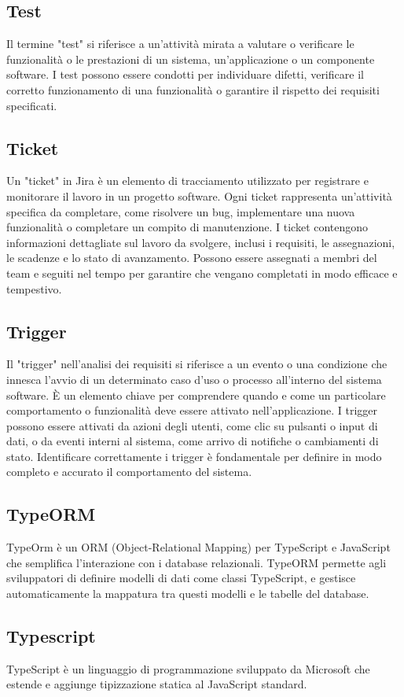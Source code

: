 \subsection*{Test} 
Il termine "test" si riferisce a un'attività mirata a valutare o verificare le funzionalità o le prestazioni di un sistema, un'applicazione o un componente software. I test possono essere condotti per individuare difetti, verificare il corretto funzionamento di una funzionalità o garantire il rispetto dei requisiti specificati. 
\subsection*{Ticket} 
Un "ticket" in Jira è un elemento di tracciamento utilizzato per registrare e monitorare il lavoro in un progetto software. Ogni ticket rappresenta un'attività specifica da completare, come risolvere un bug, implementare una nuova funzionalità o completare un compito di manutenzione. I ticket contengono informazioni dettagliate sul lavoro da svolgere, inclusi i requisiti, le assegnazioni, le scadenze e lo stato di avanzamento. Possono essere assegnati a membri del team e seguiti nel tempo per garantire che vengano completati in modo efficace e tempestivo. 
\subsection*{Trigger} 
Il "trigger" nell'analisi dei requisiti si riferisce a un evento o una condizione che innesca l'avvio di un determinato caso d'uso o processo all'interno del sistema software. È un elemento chiave per comprendere quando e come un particolare comportamento o funzionalità deve essere attivato nell'applicazione. I trigger possono essere attivati da azioni degli utenti, come clic su pulsanti o input di dati, o da eventi interni al sistema, come arrivo di notifiche o cambiamenti di stato. Identificare correttamente i trigger è fondamentale per definire in modo completo e accurato il comportamento del sistema. 
\subsection*{TypeORM} 
TypeOrm è un ORM (Object-Relational Mapping) per TypeScript e JavaScript che semplifica l'interazione con i database relazionali. TypeORM permette agli sviluppatori di definire modelli di dati come classi TypeScript, e gestisce automaticamente la mappatura tra questi modelli e le tabelle del database.
\subsection*{Typescript} 
TypeScript è un linguaggio di programmazione sviluppato da Microsoft che estende e aggiunge tipizzazione statica al JavaScript standard.
